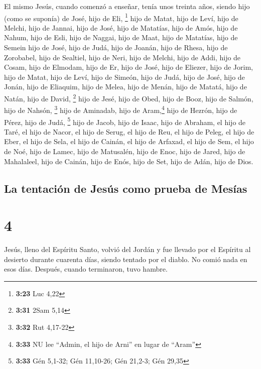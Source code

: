  El mismo Jesús, cuando comenzó a enseñar, tenía unos
treinta años, siendo hijo (como se suponía) de José, hijo de Eli,
\footnote{\textbf{3:23} Luc 4,22}  hijo de Matat, hijo de
Leví, hijo de Melchi, hijo de Jannai, hijo de José,  hijo
de Matatías, hijo de Amós, hijo de Nahum, hijo de Esli, hijo de Naggai,
 hijo de Maat, hijo de Matatías, hijo de Semein hijo de
José, hijo de Judá,  hijo de Joanán, hijo de Rhesa, hijo
de Zorobabel, hijo de Sealtiel, hijo de Neri,  hijo de
Melchi, hijo de Addi, hijo de Cosam, hijo de Elmodam, hijo de Er,
 hijo de José, hijo de Eliezer, hijo de Jorim, hijo de
Matat, hijo de Leví,  hijo de Simeón, hijo de Judá, hijo
de José, hijo de Jonán, hijo de Eliaquim,  hijo de Melea,
hijo de Menán, hijo de Matatá, hijo de Natán, hijo de David, \footnote{\textbf{3:31}
  2Sam 5,14}  hijo de Jesé, hijo de Obed, hijo de Booz,
hijo de Salmón, hijo de Nahsón, \footnote{\textbf{3:32} Rut 4,17-22}
 hijo de Aminadab, hijo de Aram,\footnote{\textbf{3:33}
  NU lee ``Admin, el hijo de Arni'' en lugar de ``Aram''} hijo de
Hezrón, hijo de Pérez, hijo de Judá, \footnote{\textbf{3:33} Gén 5,1-32;
  Gén 11,10-26; Gén 21,2-3; Gén 29,35}  hijo de Jacob,
hijo de Isaac, hijo de Abraham, el hijo de Taré, el hijo de Nacor,
 el hijo de Serug, el hijo de Reu, el hijo de Peleg, el
hijo de Eber, el hijo de Sela,  el hijo de Cainán, el
hijo de Arfaxad, el hijo de Sem, el hijo de Noé, hijo de Lamec,
 hijo de Matusalén, hijo de Enoc, hijo de Jared, hijo de
Mahalaleel, hijo de Cainán,  hijo de Enós, hijo de Set,
hijo de Adán, hijo de Dios.

\hypertarget{la-tentaciuxf3n-de-jesuxfas-como-prueba-de-mesuxedas}{%
\subsection{La tentación de Jesús como prueba de
Mesías}\label{la-tentaciuxf3n-de-jesuxfas-como-prueba-de-mesuxedas}}

\hypertarget{section-3}{%
\section{4}\label{section-3}}

 Jesús, lleno del Espíritu Santo, volvió del Jordán y fue
llevado por el Espíritu al desierto  durante cuarenta
días, siendo tentado por el diablo. No comió nada en esos días. Después,
cuando terminaron, tuvo hambre.

